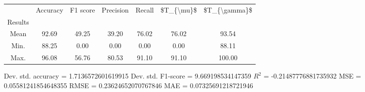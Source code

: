 \begin{tabular}{|c|c|c|c|c|c|c|}
\toprule
{} &  Accuracy &  F1 score &  Precision &  Recall &  \$T\_\{\textbackslash mu\}\$ &  \$T\_\{\textbackslash gamma\}\$ \\
Results &           &           &            &         &            &               \\
\hline
Mean    &     92.69 &     49.25 &      39.20 &   76.02 &      76.02 &         93.54 \\
Min.    &     88.25 &      0.00 &       0.00 &    0.00 &       0.00 &         88.11 \\
Max.    &     96.08 &     56.76 &      80.53 &   91.10 &      91.10 &        100.00 \\
\bottomrule
\end{tabular}

 Dev. std. accuracy = 1.7136572601619915
 Dev. std. F1-score = 9.669198534147359
 $R^2$ = -0.21487776881735932
 MSE = 0.05581241854648355
 RMSE = 0.23624652070767846
 MAE = 0.07325691218721946